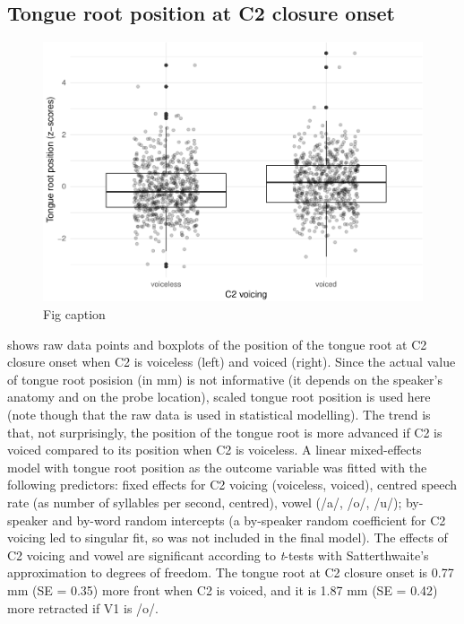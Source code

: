 \documentclass[12pt,]{article}
\begin{document}
\hypertarget{tongue-root-position-at-c2-closure-onset}{%
\subsection{Tongue root position at C2 closure
onset}\label{tongue-root-position-at-c2-closure-onset}}

\begin{figure}
\includegraphics[width=\linewidth]{2018-tra_files/figure-latex/trp-z-box-1} \caption{Fig caption}\label{f:trp-z-box}
\end{figure}

 shows raw data points and boxplots of the position of
the tongue root at C2 closure onset when C2 is voiceless (left) and
voiced (right). Since the actual value of tongue root posision (in mm)
is not informative (it depends on the speaker's anatomy and on the probe
location), scaled tongue root position is used here (note though that
the raw data is used in statistical modelling). The trend is that, not
surprisingly, the position of the tongue root is more advanced if C2 is
voiced compared to its position when C2 is voiceless. A linear
mixed-effects model with tongue root position as the outcome variable
was fitted with the following predictors: fixed effects for C2 voicing
(voiceless, voiced), centred speech rate (as number of syllables per
second, centred), vowel (/a/, /o/, /u/); by-speaker and by-word random
intercepts (a by-speaker random coefficient for C2 voicing led to
singular fit, so was not included in the final model). The effects of C2
voicing and vowel are significant according to \emph{t}-tests with
Satterthwaite's approximation to degrees of freedom. The tongue root at
C2 closure onset is 0.77 mm (SE = 0.35) more front when C2 is voiced,
and it is 1.87 mm (SE = 0.42) more retracted if V1 is /o/.
\end{document}
